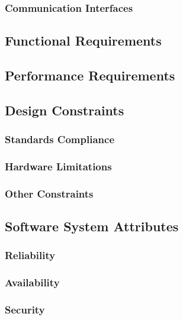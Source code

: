 \documentclass[a4paper]{article}
\begin{document}
        \subsubsection{Communication Interfaces}
    
    \subsection{Functional Requirements}
    
    \subsection{Performance Requirements}
    
    \subsection{Design Constraints}
    
        \subsubsection{Standards Compliance}
        
        \subsubsection{Hardware Limitations}
        
        \subsubsection{Other Constraints}
    
    \subsection{Software System Attributes}
        
        \subsubsection{Reliability}
        
        \subsubsection{Availability}
        
        \subsubsection{Security}
        
\end{document}
